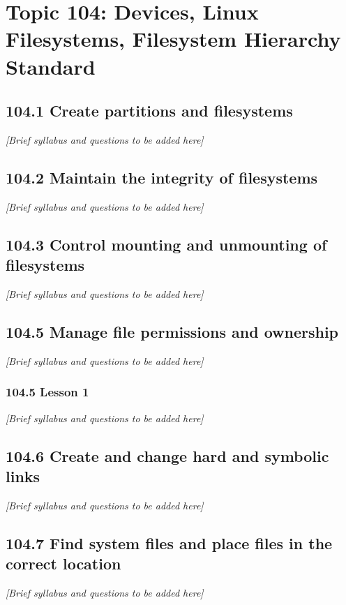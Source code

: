 \documentclass[12pt,a4paper]{report}
\begin{document}


\chapter{Topic 104: Devices, Linux Filesystems, Filesystem Hierarchy Standard}

\section{104.1 Create partitions and filesystems}
\textit{[Brief syllabus and questions to be added here]}

\section{104.2 Maintain the integrity of filesystems}
\textit{[Brief syllabus and questions to be added here]}

\section{104.3 Control mounting and unmounting of filesystems}
\textit{[Brief syllabus and questions to be added here]}

\section{104.5 Manage file permissions and ownership}
\textit{[Brief syllabus and questions to be added here]}

\subsection*{104.5 Lesson 1}
\textit{[Brief syllabus and questions to be added here]}

\section{104.6 Create and change hard and symbolic links}
\textit{[Brief syllabus and questions to be added here]}

\section{104.7 Find system files and place files in the correct location}
\textit{[Brief syllabus and questions to be added here]}
\end{document}
